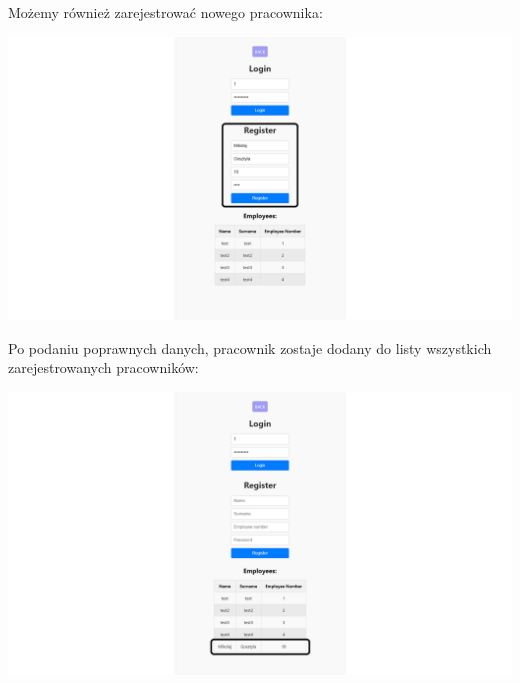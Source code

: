 \documentclass[12pt]{article}
\begin{document}
\begin{minipage}{\textwidth}
\noindent Możemy również zarejestrować nowego pracownika:
\begin{center}
\includegraphics[width=\textwidth]{media/Login_register.png}
\end{center}
\end{minipage}

\begin{minipage}{\textwidth}
\noindent Po podaniu poprawnych danych, pracownik zostaje dodany do listy wszystkich zarejestrowanych pracowników:
\begin{center}
\includegraphics[width=\textwidth]{media/Login_registrationSuccessfull.png}
\end{center}
\end{minipage}
\end{document}
